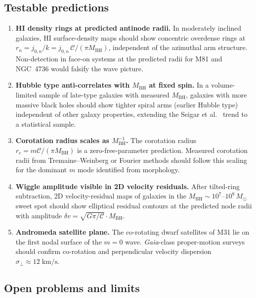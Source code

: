 \documentclass[11pt,a4paper]{article}
\begin{document}
\subsection{Testable predictions}

\begin{enumerate}
  \item \textbf{HI density rings at predicted antinode radii.}
    In moderately inclined galaxies, HI surface-density maps should show concentric
    overdense rings at $r_n = j_{0,n}/k = j_{0,n}\,\mathcal{C}/(\pi M_\mathrm{BH})$,
    independent of the azimuthal arm structure.  Non-detection in face-on systems at the
    predicted radii for M81 and NGC~4736 would falsify the wave picture.

  \item \textbf{Hubble type anti-correlates with $M_\mathrm{BH}$ at fixed spin.}
    In a volume-limited sample of late-type galaxies with measured $M_\mathrm{BH}$,
    galaxies with more massive black holes should show tighter spiral arms (earlier Hubble
    type) independent of other galaxy properties, extending the Seigar et
    al.~\cite{seigar2008} trend to a statistical sample.

  \item \textbf{Corotation radius scales as $M_\mathrm{BH}^{-1}$.}
    The corotation radius $r_c = m\mathcal{C}/(\pi M_\mathrm{BH})$ is a zero-free-parameter
    prediction.  Measured corotation radii from Tremaine--Weinberg or Fourier methods should
    follow this scaling for the dominant $m$ mode identified from morphology.

  \item \textbf{Wiggle amplitude visible in 2D velocity residuals.}
    After tilted-ring subtraction, 2D velocity-residual maps of galaxies in the
    $M_\mathrm{BH}\sim10^7$--$10^8\,M_\odot$ sweet spot should show elliptical
    residual contours at the predicted node radii with amplitude
    $\delta v = \sqrt{G\pi/\mathcal{C}}\cdot M_\mathrm{BH}$.

  \item \textbf{Andromeda satellite plane.}
    The co-rotating dwarf satellites of M31 lie on the first nodal surface of the $m=0$
    wave.  \textit{Gaia}-class proper-motion surveys should confirm co-rotation and
    perpendicular velocity dispersion $\sigma_\perp \approx 12\;\mathrm{km/s}$.
\end{enumerate}

\subsection{Open problems and limits}
\end{document}
